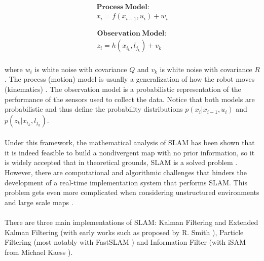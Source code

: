 \documentclass[12pt]{article}
\begin{document}
	\begin{minipage}{.48\linewidth}
		\centering
		\begin{equation*}
		\begin{split}
		\mathbf{Process\ Model:} \\ 
		x_i = f(x_{i-1}, u_i) + w_i
		\end{split}
		\end{equation*}
	\end{minipage}
	\begin{minipage}{.48\linewidth}
		\centering
		\begin{equation*}
		\begin{split}
		\mathbf{Observation\ Model:} \\ 
		z_i = h(x_{i_k}, l_{j_k}) + v_k
		\end{split}
		\end{equation*}
	\end{minipage}
	
	\paragraph{}
	where $w_i$ is white noise with covariance $Q$ and $v_k$ is white noise with covariance $R$. The process (motion) model is usually a generalization of how the robot moves (kinematics) \cite{Montemerlo02fastslam:a}\cite{772544}. The observation model is a probabilistic representation of the performance of the sensors used to collect the data. Notice that both models are probabilistic and thus define the probability distributions $p(x_i|x_{i-1},u_i)$ and $p(z_k|x_{i_k},l_{j_k})$.

	\paragraph{}
	Under this framework, the mathematical analysis of SLAM has been shown that it is indeed feasible to build a nondivergent map with no prior information, so it is widely accepted that in theoretical grounds, SLAM is a solved problem \cite{SLAMPartI}\cite{Cadena}\cite{CsorbaThesis}\cite{938381}. However, there are computational and algorithmic challenges that hinders the development of a real-time implementation system that performs SLAM. This problem gets even more complicated when considering unstructured environments and large scale maps \cite{SLAMPartII}.
	
	\paragraph{}
	There are three main implementations of SLAM: Kalman Filtering and Extended Kalman Filtering (with early works such as proposed by R. Smith \cite{Smith:1990:EUS:93002.93291}), Particle Filtering (most notably with FastSLAM \cite{Montemerlo02fastslam:a}) and Information Filter (with iSAM from Michael Kaess \cite{Kaess08tro}).
\end{document}

